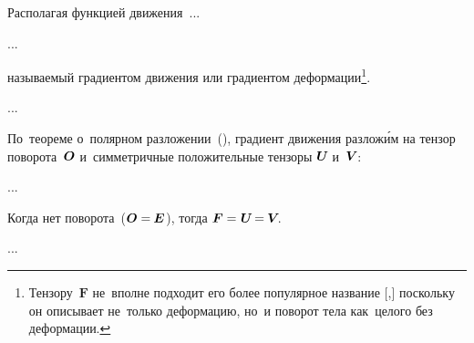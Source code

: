 \begin{otherlanguage}{russian}
\vspace{1.5em}

Располагая функцией движения~...

...

\noindent называемый градиентом движения или градиентом деформации\footnote{Тензору~$\bm{F}$ не~вполне подходит его более популярное название [,] поскольку он описывает не~только деформацию, но~и поворот тела как~целого без деформации.}\hspace{-0.5em}.

...

По~теореме о~полярном разложении~(), градиент движения разлож\'{и}м на тензор поворота~$\bm{O}$ и~симметричные положительные тензоры ${\bm{U}\hspace{-0.25ex}}$ и~${\bm{V}\hspace{-0.2ex}}$:

...

Когда нет поворота~(${\bm{O} = \hspace{-0.1ex} \bm{E} \hspace{0.1ex}}$), тогда ${\bm{F} = \hspace{0.1ex} \bm{U} \hspace{-0.25ex} = \hspace{-0.1ex} \bm{V}\hspace{-0.4ex}}$.

...






\label{para:deformationtensors}


\end{otherlanguage}
